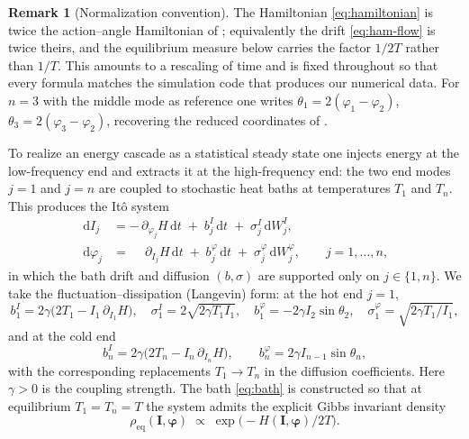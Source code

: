 \documentclass[11pt,a4paper]{article}
\theoremstyle{definition}
\newtheorem{remark}[theorem]{Remark}
\newcommand{\dd}{\,\mathrm{d}}
\numberwithin{equation}{section}   %
\newcommand{\bI}{\mathbf{I}}
\newcommand{\bphi}{\boldsymbol{\varphi}}
\begin{document}
\begin{remark}[Normalization convention]\label{rem:convention}
The Hamiltonian \eqref{eq:hamiltonian} is twice the action--angle Hamiltonian of
\cite{HLNS}; equivalently the drift \eqref{eq:ham-flow} is twice theirs, and the
equilibrium measure below carries the factor $1/2T$ rather than $1/T$. This
amounts to a rescaling of time and is fixed throughout so that every formula
matches the simulation code that produces our numerical data. For $n=3$ with the
middle mode as reference one writes $\theta_1=2(\varphi_1-\varphi_2)$,
$\theta_3=2(\varphi_3-\varphi_2)$, recovering the reduced coordinates of
\cite{HLNS}.
\end{remark}

To realize an energy cascade as a statistical steady state one injects energy at
the low-frequency end and extracts it at the high-frequency end: the two end
modes $j=1$ and $j=n$ are coupled to stochastic heat baths at temperatures $T_1$
and $T_n$. This produces the It\^o system
\begin{align}\label{eq:sde-bulk}
  \dd I_j   &= -\,\partial_{\varphi_j} H \dd t
             \;+\; b^{I}_j \dd t \;+\; \sigma^{I}_j \dd W^{I}_j, \\
  \dd \varphi_j &= \phantom{-}\partial_{I_j} H \dd t
             \;+\; b^{\varphi}_j \dd t \;+\; \sigma^{\varphi}_j \dd W^{\varphi}_j,
             \qquad j = 1,\dots,n, \nonumber
\end{align}
in which the bath drift and diffusion $(b,\sigma)$ are supported only on
$j\in\{1,n\}$. We take the fluctuation--dissipation (Langevin) form: at the hot
end $j=1$,
\begin{equation}\label{eq:bath}
  b^{I}_1 = 2\gamma\big(2T_1 - I_1\,\partial_{I_1}H\big),\quad
  \sigma^{I}_1 = 2\sqrt{2\gamma T_1 I_1},\quad
  b^{\varphi}_1 = -2\gamma I_2 \sin\theta_2,\quad
  \sigma^{\varphi}_1 = \sqrt{2\gamma T_1/I_1},
\end{equation}
and at the cold end
\[
  b^{I}_n=2\gamma\big(2T_n-I_n\,\partial_{I_n}H\big),\qquad
  b^{\varphi}_n=2\gamma I_{n-1}\sin\theta_n,
\]
with the corresponding replacements $T_1\to T_n$ in the diffusion
coefficients. Here $\gamma>0$ is the coupling strength. The bath
\eqref{eq:bath} is constructed so that at equilibrium
$T_1=T_n=T$ the system admits the explicit Gibbs invariant density
\begin{equation}\label{eq:gibbs}
  \rho_{\mathrm{eq}}(\bI,\bphi) \;\propto\; \exp\!\big(-H(\bI,\bphi)/2T\big).
\end{equation}
\end{document}
